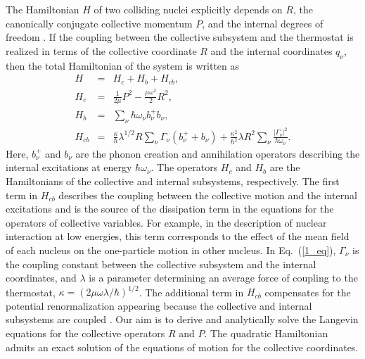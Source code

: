 \documentclass[preprint,review,12pt]{elsarticle}
\begin{document}
  The Hamiltonian $H$ of two colliding nuclei explicitly depends on $R$, the canonically
  conjugate collective momentum $P$, and the internal
  degrees of freedom \cite{Leggett,Jolos}. If the coupling between the collective subsystem and the
  thermostat is realized in terms of the collective coordinate $R$ and the internal coordinates $q_{\nu}$, then the total
  Hamiltonian of the system is written as
  \begin{eqnarray}
  H&=&H_c+H_b+H_{cb},\nonumber\\
  H_c&=&\frac{1}{2\mu}P^2-\frac{\mu\omega^2}{2}R^2,\nonumber\\
  H_b&=&\sum_{\nu}^{}\hbar\omega_\nu b_\nu^+b_\nu,\nonumber\\
  H_{cb}&=&\frac{\kappa}{\hbar}\lambda^{1/2}R\sum_{\nu}^{}\Gamma_\nu(b_\nu^+ + b_\nu)
  +\frac{\kappa^2}{\hbar^2}\lambda R^2\sum_{\nu}^{}\frac{|\Gamma_\nu|^2}{\hbar\omega_\nu}.
  \label{1_eq}
  \end{eqnarray}
  Here, $b_\nu^+$ and $b_\nu$ are the phonon creation and annihilation operators describing the internal
  excitations at energy $\hbar \omega_\nu$. The operators $H_{c}$ and $H_{b}$
  are the Hamiltonians of the collective and internal subsystems, respectively. The first term in $H_{cb}$ describes
  the coupling between the collective motion and the internal excitations and is the source of the dissipation
  term in the equations for the operators of collective variables. For example, in the description of nuclear
  interaction at low energies, this term corresponds to the effect of the mean field of each nucleus on the
  one-particle motion in other nucleus. In Eq.~(\ref{1_eq}), $\Gamma_\nu$ is the coupling constant between the collective
  subsystem and the internal coordinates, and $\lambda$ is a parameter determining an average force of
  coupling to the thermostat, $\kappa=(2\mu\omega\lambda/\hbar)^{1/2}$. The additional term in $H_{cb}$ compensates for the potential
  renormalization appearing because the collective and internal subsystems are coupled \cite{Leggett}. Our aim is to
  derive and analytically solve the Langevin equations for the collective operators $R$ and $P$. The quadratic
  Hamiltonian admits an exact solution of the equations of motion for the collective coordinates.
\end{document}
